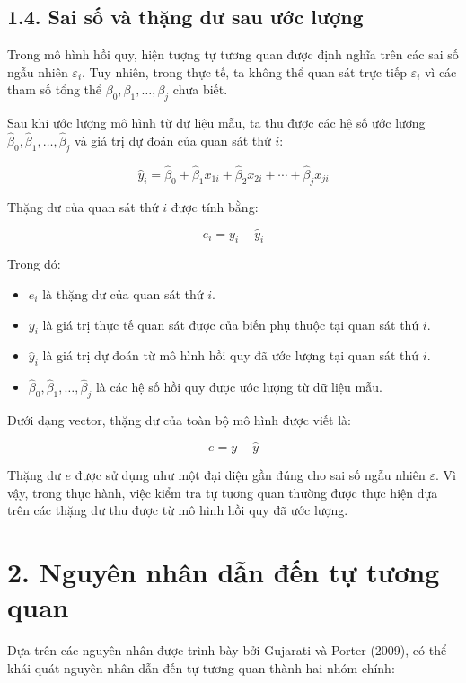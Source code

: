 \documentclass[12pt,a4paper]{article}
\begin{document}
\subsection{1.4. Sai số và thặng dư sau ước lượng}

Trong mô hình hồi quy, hiện tượng tự tương quan được định nghĩa trên các sai số ngẫu nhiên $\varepsilon_i$. Tuy nhiên, trong thực tế, ta không thể quan sát trực tiếp $\varepsilon_i$ vì các tham số tổng thể $\beta_0,\beta_1,\ldots,\beta_j$ chưa biết.

Sau khi ước lượng mô hình từ dữ liệu mẫu, ta thu được các hệ số ước lượng
$\hat{\beta}_0,\hat{\beta}_1,\ldots,\hat{\beta}_j$ và giá trị dự đoán của quan sát thứ $i$:

\[
\hat{y}_i
=
\hat{\beta}_0
+
\hat{\beta}_1 x_{1i}
+
\hat{\beta}_2 x_{2i}
+
\cdots
+
\hat{\beta}_j x_{ji}
\]

Thặng dư của quan sát thứ $i$ được tính bằng:

\[
e_i
=
y_i-\hat{y}_i
\]

Trong đó:

\begin{itemize}
    \item $e_i$ là thặng dư của quan sát thứ $i$.
    
    \item $y_i$ là giá trị thực tế quan sát được của biến phụ thuộc tại quan sát thứ $i$.
    
    \item $\hat{y}_i$ là giá trị dự đoán từ mô hình hồi quy đã ước lượng tại quan sát thứ $i$.
    
    \item $\hat{\beta}_0,\hat{\beta}_1,\ldots,\hat{\beta}_j$ là các hệ số hồi quy được ước lượng từ dữ liệu mẫu.
\end{itemize}

Dưới dạng vector, thặng dư của toàn bộ mô hình được viết là:

\[
e
=
y-\hat{y}
\]

Thặng dư $e$ được sử dụng như một đại diện gần đúng cho sai số ngẫu nhiên $\varepsilon$. Vì vậy, trong thực hành, việc kiểm tra tự tương quan thường được thực hiện dựa trên các thặng dư thu được từ mô hình hồi quy đã ước lượng.

\section{2. Nguyên nhân dẫn đến tự tương quan}

Dựa trên các nguyên nhân được trình bày bởi Gujarati và Porter (2009), có thể khái quát nguyên nhân dẫn đến tự tương quan thành hai nhóm chính:
\end{document}
